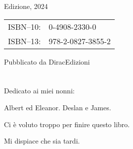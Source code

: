 {\begin{flushleft}
\begin{justify}
{		\bigskip
		
		\textonesuperior Edizione, 2024
		
		\bigskip
		
		\begin{tabular}{rl}
			ISBN--10:& 0-4908-2330-0\\ 
			ISBN--13:& 978-2-0827-3855-2\\ 
		\end{tabular}	
		
		\bigskip
		
		Pubblicato da DiracEdizioni 
		}
	\end{justify}
\end{flushleft}

\let\cleardoublepage\clearpage

\chapter*{\phantom{DEDICA}}


	\begin{dedica}
		Dedicato ai miei nonni:
		
		Albert ed Eleanor. Deslan e James.
		
		Ci è voluto troppo per finire questo libro.
		
		Mi dispiace che sia tardi.
	\end{dedica}
}

\setcounter{page}{1}
 
